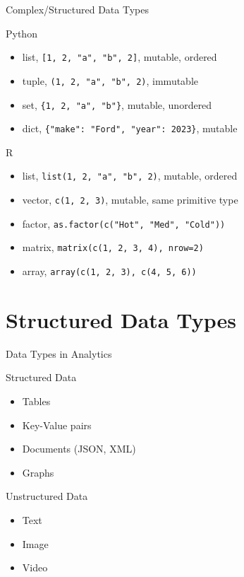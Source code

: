 \documentclass[ignorenonframetext,xcolor=x11names]{beamer}
\begin{document}
\begin{frame}{Complex/Structured Data Types}
\small
\begin{block}{Python}
	\begin{itemize}
		\item list, \texttt{[1, 2, "a", "b", 2]}, mutable, ordered
		\item tuple, \texttt{(1, 2, "a", "b", 2)}, immutable
		\item set, \texttt{\{1, 2, "a", "b"\}},  mutable, unordered
		\item dict, \texttt{\{"make": "Ford", "year": 2023\}}, mutable
	\end{itemize}
\end{block}
\begin{block}{R}
	\begin{itemize}
		\item list, \texttt{list(1, 2, "a", "b", 2)}, mutable, ordered
		\item vector, \texttt{c(1, 2, 3)}, mutable, same primitive type
		\item factor, \texttt{as.factor(c("Hot", "Med", "Cold"))}
		\item matrix, \texttt{matrix(c(1, 2, 3, 4), nrow=2)}
		\item array, \texttt{array(c(1, 2, 3), c(4, 5, 6))}
	\end{itemize}
\end{block}
\end{frame}

\section{Structured Data Types}

\begin{frame}{Data Types in Analytics}
\begin{block}{Structured Data}
\begin{itemize}
	\item Tables
	\item Key-Value pairs
	\item Documents (JSON, XML)
	\item Graphs
\end{itemize}
\end{block}
\begin{block}{Unstructured Data}
\begin{itemize}
	\item Text
	\item Image
	\item Video
\end{itemize}
\end{block}
\end{frame}
\end{document}
